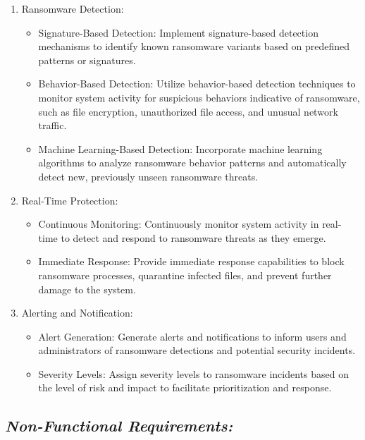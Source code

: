 \documentclass[12pt,twocolumn]{article}
\begin{document}
\begin{enumerate}[label=\arabic*.]
    \item Ransomware Detection:
        \begin{itemize}
             \item Signature-Based Detection: Implement signature-based detection mechanisms to identify known ransomware variants based on predefined patterns or signatures.
            \item Behavior-Based Detection: Utilize behavior-based detection techniques to monitor system activity for suspicious behaviors indicative of ransomware, such as file encryption, unauthorized file access, and unusual network traffic.
            \item Machine Learning-Based Detection: Incorporate machine learning algorithms to analyze ransomware behavior patterns and automatically detect new, previously unseen ransomware threats.
        \end{itemize}

    \item Real-Time Protection:  
        \begin{itemize}
            \item Continuous Monitoring: Continuously monitor system activity in real-time to detect and respond to ransomware threats as they emerge.
            \item Immediate Response: Provide immediate response capabilities to block ransomware processes, quarantine infected files, and prevent further damage to the system.
        \end{itemize}

    \item Alerting and Notification:
        \begin{itemize}
            \item Alert Generation: Generate alerts and notifications to inform users and administrators of ransomware detections and potential security incidents.
            \item Severity Levels: Assign severity levels to ransomware incidents based on the level of risk and impact to facilitate prioritization and response.
        \end{itemize}
           
\end{enumerate}

\subsection{\textbf{\textit{Non-Functional Requirements:}}}
\end{document}
